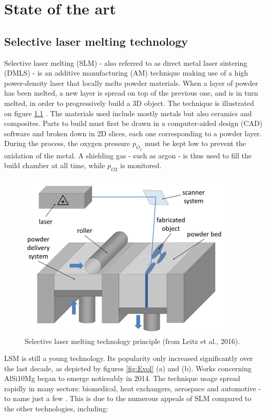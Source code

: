 \chapter{State of the art}
\label{Chap2}
\section{Selective laser melting technology}
Selective laser melting (SLM) - also referred to as direct metal laser sintering (DMLS) - is an additive manufacturing  (AM) technique making use of a high power-density laser that locally melts powder materials.%
 When a layer of powder has been melted, a new layer is spread on top of the previous one, and is in turn melted, in order to progressively build a 3D object. The technique is illustrated on figure \ref{fig:SLM} \parencite{LEITZ2017331}. The materials used include mostly metals but also ceramics and composites. Parts to build must first be drawn in a computer-aided design (CAD) software and broken down in 2D slices, each one corresponding to a powder layer. During the process, the oxygen pressure $p_{O_2}$ must be kept low to prevent the oxidation of the metal. A shielding gas - such as argon - is thus used to fill the build chamber at all time, while $p_{O2}$ is monitored.   \\

\begin{figure}[th]
\centering
\includegraphics[scale=0.7]{Images/SLM}
\decoRule
\caption[Selective laser melting technology principle]{Selective laser melting technology principle (from Leitz et al., 2016).}
\label{fig:SLM}
\end{figure}

LSM is still a young technology. Its popularity only increased significantly over the last decade, as depicted by figures \ref{fig:Evol} (a) and (b). Works concerning AlSi10Mg began to emerge noticeably in 2014. The technique usage spread rapidly in many sectors: biomedical, heat exchangers, aerospace and automotive - to name just a few \parencite{Yap}. This is due to the numerous appeals of SLM compared to the other technologies, including:\\

